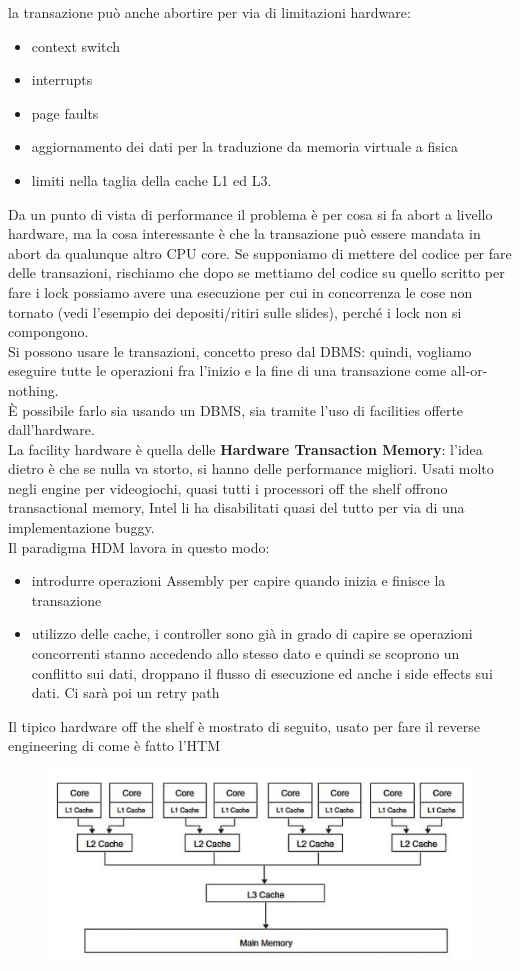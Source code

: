 \documentclass[12pt, oneside]{extbook} %
\begin{document}
la transazione può anche abortire per via di limitazioni hardware:
\begin{itemize}
	\item context switch
	\item interrupts
	\item page faults
	\item aggiornamento dei dati per la traduzione da memoria virtuale a fisica
	\item limiti nella taglia della cache L1 ed L3.
\end{itemize}
Da un punto di vista di performance il problema è per cosa si fa abort a livello hardware, ma la cosa interessante è che la transazione può essere mandata in abort da qualunque altro CPU core.
Se supponiamo di mettere del codice per fare delle transazioni, rischiamo che dopo se mettiamo del codice su quello scritto per fare i lock possiamo avere una esecuzione per cui in concorrenza le cose non tornato (vedi l'esempio dei depositi/ritiri sulle slides), perché i lock non si compongono.\\ Si possono usare le transazioni, concetto preso dal DBMS: quindi, vogliamo eseguire tutte le operazioni fra l'inizio e la fine di una transazione come all-or-nothing.\\È possibile farlo sia usando un DBMS, sia tramite l'uso di facilities offerte dall'hardware.\\ La facility hardware è quella delle \textbf{Hardware Transaction Memory}: l'idea dietro è che se nulla va storto, si hanno delle performance migliori. Usati molto negli engine per videogiochi, quasi tutti i processori off the shelf offrono transactional memory, Intel li ha disabilitati quasi del tutto per via di una implementazione buggy.\\ Il paradigma HDM lavora in questo modo:
\begin{itemize}
\item introdurre operazioni Assembly per capire quando inizia e finisce la transazione
\item utilizzo delle cache, i controller sono già in grado di capire se operazioni concorrenti stanno accedendo allo stesso dato e quindi se scoprono un conflitto sui dati, droppano il flusso di esecuzione ed anche i side effects sui dati. Ci sarà poi un retry path
\end{itemize}
Il tipico hardware off the shelf è mostrato di seguito, usato per fare il reverse engineering di come è fatto l'HTM
\begin{figure}[!h]
	\includegraphics[scale=0.3]{immagini/htm_hw.png}
\end{figure}
\end{document}
